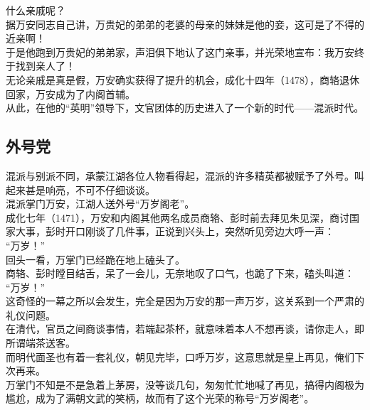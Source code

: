 \begin{multicols}{\theparacolNo}
什么亲戚呢？\\

据万安同志自己讲，万贵妃的弟弟的老婆的母亲的妹妹是他的妾，这可是了不得的近亲啊！\\

于是他跑到万贵妃的弟弟家，声泪俱下地认了这门亲事，并光荣地宣布：我万安终于找到亲人了！\\

无论亲戚是真是假，万安确实获得了提升的机会，成化十四年（1478），商辂退休回家，万安成为了内阁首辅。\\

从此，在他的“英明”领导下，文官团体的历史进入了一个新的时代——混派时代。\\

\subsection{外号党}
混派与别派不同，承蒙江湖各位人物看得起，混派的许多精英都被赋予了外号。叫起来甚是响亮，不可不仔细谈谈。\\

混派掌门万安，江湖人送外号“万岁阁老”。\\

成化七年（1471），万安和内阁其他两名成员商辂、彭时前去拜见朱见深，商讨国家大事，彭时开口刚谈了几件事，正说到兴头上，突然听见旁边大呼一声：\\

“万岁！”\\

回头一看，万掌门已经跪在地上磕头了。\\

商辂、彭时瞠目结舌，呆了一会儿，无奈地叹了口气，也跪了下来，磕头叫道：\\

“万岁！”\\

这奇怪的一幕之所以会发生，完全是因为万安的那一声万岁，这关系到一个严肃的礼仪问题。\\

在清代，官员之间商谈事情，若端起茶杯，就意味着本人不想再谈，请你走人，即所谓端茶送客。\\

而明代面圣也有着一套礼仪，朝见完毕，口呼万岁，这意思就是皇上再见，俺们下次再来。\\

万掌门不知是不是急着上茅房，没等谈几句，匆匆忙忙地喊了再见，搞得内阁极为尴尬，成为了满朝文武的笑柄，故而有了这个光荣的称号“万岁阁老”。\\


\end{multicols}
